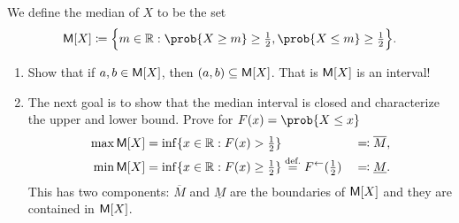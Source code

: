 \begin{exercise}
	We define the median of \(X\) to be the set
    \[
        \mSym[X] \coloneq \set[\Big]{m \in \real : \prob{X \ge m}\ge \tfrac12, \prob{X\le m} \ge \tfrac12}.
    \]
	\begin{enumerate}[label=(\alph*), noitemsep]
        \item Show that if \(a,b\in \mathsf{M}[X]\), then \((a,b) \subseteq \mathsf{M}[X]\).
        That is \(\mathsf{M}[X]\) is an interval!

        \item The next goal is to show that the median interval is closed
        and characterize the upper and lower bound. Prove for \(F(x) = \prob{X\le x}\)
        \begin{alignat*}{2}
            \max \mathsf{M}[X] &= \inf \{x \in \mathbb{R} : F(x) > \tfrac12\}
            &&\eqcolon \overline{M},
            \\
            \min \mathsf{M}[X] &= \inf \{x \in \mathbb{R} : F(x) \ge \tfrac12\} \overset{\text{def.}}= F^{\leftarrow}(\tfrac12)
            &&\eqcolon \underline{M}.
        \end{alignat*}
        This has two components: \(\overline{M}\) and \(\underline{M}\) are the boundaries of \(\mathsf{M}[X]\)
        and they are contained in \(\mathsf{M}[X]\).


\end{enumerate}
\end{exercise}
